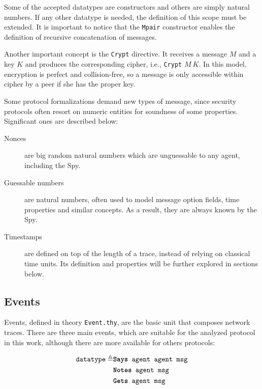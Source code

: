 Some of the accepted datatypes are constructors and others are simply natural numbers. If any other datatype is needed, the definition of this scope must be extended. It is important to notice that the \texttt{Mpair} constructor enables the definition of recursive concatenation of messages.

Another important concept is the \texttt{Crypt} directive. It receives a message $M$ and a key $K$ and produces the corresponding cipher, i.e., \texttt{Crypt} $M\ K$. In this model, encryption is perfect and collision-free, so a message is only accessible within cipher by a peer if she has the proper key.

Some protocol formalizations demand new types of message, since security protocols often resort on numeric entities for soundness of some properties. Significant ones are described below:

\begin{description}
  \item[Nonces] are big random natural numbers which are unguessable to any agent, including the Spy.

  \item[Guessable numbers] are natural numbers, often used to model message option fields, time properties and similar concepts. As a result, they are always known by the Spy.

  \item[Timestamps] are defined on top of the length of a trace, instead of relying on classical time units. Its definition and properties will be further explored in sections below.
\end{description}



\subsection{Events}
Events, defined in theory \texttt{Event.thy}, are the basic unit that composes network traces. There are three main events, which are suitable for the analyzed protocol in this work, although there are more available for others protocols:

\begin{equation*}
  \begin{split}
    \texttt{datatype} \triangleq
    & \texttt{\textbf{Says} agent agent msg} \\
    & \texttt{\textbf{Notes} agent msg} \\
    & \texttt{\textbf{Gets} agent msg}
  \end{split}
\end{equation*}

